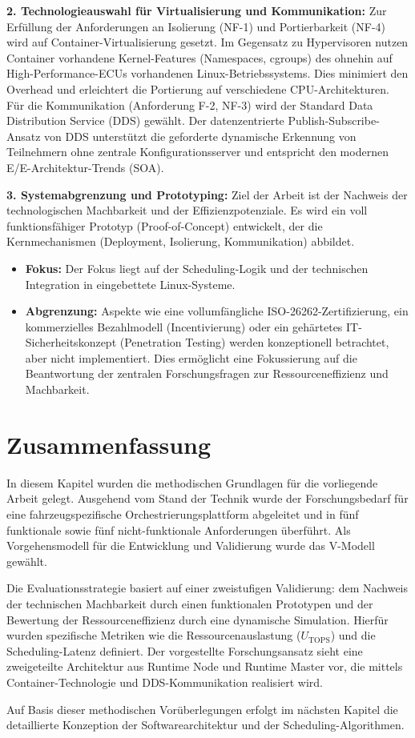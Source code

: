 \textbf{2. Technologieauswahl für Virtualisierung und Kommunikation:} Zur Erfüllung der Anforderungen an Isolierung (NF-1) und Portierbarkeit (NF-4) wird auf Container-Virtualisierung gesetzt. Im Gegensatz zu Hypervisoren nutzen Container vorhandene Kernel-Features (Namespaces, cgroups) des ohnehin auf High-Performance-ECUs vorhandenen Linux-Betriebssystems. Dies minimiert den Overhead und erleichtert die Portierung auf verschiedene CPU-Architekturen. Für die Kommunikation (Anforderung F-2, NF-3) wird der Standard Data Distribution Service (DDS) gewählt. Der datenzentrierte Publish-Subscribe-Ansatz von DDS unterstützt die geforderte dynamische Erkennung von Teilnehmern ohne zentrale Konfigurationsserver und entspricht den modernen E/E-Architektur-Trends (\gls{SOA}).

\textbf{3. Systemabgrenzung und Prototyping:} Ziel der Arbeit ist der Nachweis der technologischen Machbarkeit und der Effizienzpotenziale. Es wird ein voll funktionsfähiger Prototyp (Proof-of-Concept) entwickelt, der die Kernmechanismen (Deployment, Isolierung, Kommunikation) abbildet.

\begin{itemize}
    \item \textbf{Fokus:} Der Fokus liegt auf der Scheduling-Logik und der technischen Integration in eingebettete Linux-Systeme.
    \item \textbf{Abgrenzung:} Aspekte wie eine vollumfängliche ISO-26262-Zertifizierung, ein kommerzielles Bezahlmodell (Incentivierung) oder ein gehärtetes IT-Sicherheitskonzept (Penetration Testing) werden konzeptionell betrachtet, aber nicht implementiert. Dies ermöglicht eine Fokussierung auf die Beantwortung der zentralen Forschungsfragen zur Ressourceneffizienz und Machbarkeit.
\end{itemize}

\section{Zusammenfassung}
\label{sec:MethodikZusammenfassung}

In diesem Kapitel wurden die methodischen Grundlagen für die vorliegende Arbeit gelegt. Ausgehend vom Stand der Technik wurde der Forschungsbedarf für eine fahrzeugspezifische Orchestrierungsplattform abgeleitet und in fünf funktionale sowie fünf nicht-funktionale Anforderungen überführt. Als Vorgehensmodell für die Entwicklung und Validierung wurde das V-Modell gewählt.

Die Evaluationsstrategie basiert auf einer zweistufigen Validierung: dem Nachweis der technischen Machbarkeit durch einen funktionalen Prototypen und der Bewertung der Ressourceneffizienz durch eine dynamische Simulation. Hierfür wurden spezifische Metriken wie die Ressourcenauslastung ($U_{\text{TOPS}}$) und die Scheduling-Latenz definiert. Der vorgestellte Forschungsansatz sieht eine zweigeteilte Architektur aus Runtime Node und Runtime Master vor, die mittels Container-Technologie und DDS-Kommunikation realisiert wird.

Auf Basis dieser methodischen Vorüberlegungen erfolgt im nächsten Kapitel die detaillierte Konzeption der Softwarearchitektur und der Scheduling-Algorithmen.